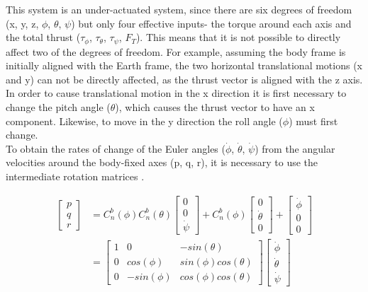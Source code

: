 This system is an under-actuated system, since there are six degrees of freedom (x, y, z, $\phi$, $\theta$, $\psi$) but only four effective inputs- the torque around each axis and the total thrust ($\tau_{\phi}$, $\tau_{\theta}$, 
$\tau_{\psi}$, $F_{T}$). This means that it is not possible to directly affect two of the degrees of freedom. For example, assuming the body frame is initially aligned with the Earth frame, the two horizontal translational motions (x and y) can not be directly affected, as the thrust vector is aligned with the z axis. In order to cause translational motion in the x direction it is first necessary to change the pitch angle ($\theta$), which causes the thrust vector to have an x component. Likewise, to move in the y direction the roll angle ($\phi$) must first change.\\

To obtain the rates of change of the Euler angles ($\dot{\phi}$, $\dot{\theta}$, $\dot{\psi}$) from the angular velocities around the body-fixed axes (p, q, r), it is necessary to use the intermediate rotation matrices \cite{Nelson1997}.


\begin{align*}
\begin{bmatrix}
p\\q\\r
\end{bmatrix}
&= C^{b}_{n}(\phi)C^{b}_{n}(\theta)
\begin{bmatrix}
0\\0\\\dot{\psi}
\end{bmatrix}
+C^{b}_{n}(\phi)
\begin{bmatrix}
0\\\dot{\theta}\\0
\end{bmatrix}
+
\begin{bmatrix}
\dot{\phi}\\0\\0
\end{bmatrix}\\
&=
\begin{bmatrix}
1 & 0 & -sin(\theta)\\
0 & cos(\phi) & sin(\phi)cos(\theta)\\
0 & -sin(\phi) & cos(\phi)cos(\theta)
\end{bmatrix}
\begin{bmatrix}
\dot{\phi}\\ \dot{\theta} \\ \dot{\psi}
\end{bmatrix}\\
\end{align*}

